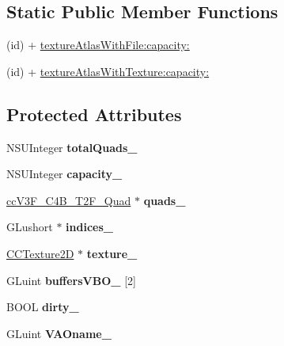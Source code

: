 \subsection*{Static Public Member Functions}
\begin{DoxyCompactItemize}
\item 
(id) + \hyperlink{interface_c_c_texture_atlas_a7f32e0fe47d137f967b8a2998427f865}{texture\-Atlas\-With\-File\-:capacity\-:}
\item 
(id) + \hyperlink{interface_c_c_texture_atlas_a6759f15bef0c97282c8ce561c13aa800}{texture\-Atlas\-With\-Texture\-:capacity\-:}
\end{DoxyCompactItemize}
\subsection*{Protected Attributes}
\begin{DoxyCompactItemize}
\item 
\hypertarget{interface_c_c_texture_atlas_aed094c04018f9b1cced889affc4d1478}{N\-S\-U\-Integer {\bfseries total\-Quads\-\_\-}}\label{interface_c_c_texture_atlas_aed094c04018f9b1cced889affc4d1478}

\item 
\hypertarget{interface_c_c_texture_atlas_a4610c1f17f8398d3b76c8889cf230dee}{N\-S\-U\-Integer {\bfseries capacity\-\_\-}}\label{interface_c_c_texture_atlas_a4610c1f17f8398d3b76c8889cf230dee}

\item 
\hypertarget{interface_c_c_texture_atlas_a731c69a75c44f0884a6b7e4acc881cd7}{\hyperlink{cc_types_8h_ab2642984bbb3d2fa1fe4fedb5657a065}{cc\-V3\-F\-\_\-\-C4\-B\-\_\-\-T2\-F\-\_\-\-Quad} $\ast$ {\bfseries quads\-\_\-}}\label{interface_c_c_texture_atlas_a731c69a75c44f0884a6b7e4acc881cd7}

\item 
\hypertarget{interface_c_c_texture_atlas_a43693ed3be60763256293d152a880d5f}{G\-Lushort $\ast$ {\bfseries indices\-\_\-}}\label{interface_c_c_texture_atlas_a43693ed3be60763256293d152a880d5f}

\item 
\hypertarget{interface_c_c_texture_atlas_a29f4d6fa8d0cabce6c2703f4e978fe28}{\hyperlink{class_c_c_texture2_d}{C\-C\-Texture2\-D} $\ast$ {\bfseries texture\-\_\-}}\label{interface_c_c_texture_atlas_a29f4d6fa8d0cabce6c2703f4e978fe28}

\item 
\hypertarget{interface_c_c_texture_atlas_aef52262a24b08df85b84dcbdcf267eb2}{G\-Luint {\bfseries buffers\-V\-B\-O\-\_\-} \mbox{[}2\mbox{]}}\label{interface_c_c_texture_atlas_aef52262a24b08df85b84dcbdcf267eb2}

\item 
\hypertarget{interface_c_c_texture_atlas_a3f7d06787f400072f38f7bad476c9111}{B\-O\-O\-L {\bfseries dirty\-\_\-}}\label{interface_c_c_texture_atlas_a3f7d06787f400072f38f7bad476c9111}

\item 
\hypertarget{interface_c_c_texture_atlas_acc9d81be8422e1a3eb7d05c709b87aa5}{G\-Luint {\bfseries V\-A\-Oname\-\_\-}}\label{interface_c_c_texture_atlas_acc9d81be8422e1a3eb7d05c709b87aa5}

\end{DoxyCompactItemize}
